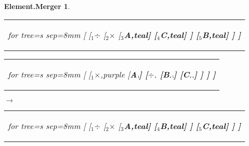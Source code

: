 \documentclass[UTF8,10pt]{ctexart}
\newcommand{\subtreeA}{\bf A}
\newcommand{\subtreeB}{\bf B}
\newcommand{\subtreeC}{\bf C}
\newcommand{\I}{$_{\scriptscriptstyle 1}$}
\newcommand{\II}{$_{\scriptscriptstyle 2}$}
\newcommand{\III}{$_{\scriptscriptstyle 3}$}
\newcommand{\IV}{$_{\scriptscriptstyle 4}$}
\newcommand{\V}{$_{\scriptscriptstyle 5}$}
\newcommand{\lc}{$_{\:\!\scriptscriptstyle\rm l\!}$}
\newcommand{\rc}{$_{\:\!\scriptscriptstyle\rm r\!}$}
\newcommand{\Multiplication}{$\times$}
\newcommand{\Division}{$\div$}
\newtheorem*{Element.Merger}{\bf Element.Merger }
\begin{document}
\begin{center}
\begin{Element.Merger}
\begin{tabular}{c}
				\begin{forest}
					for tree={s sep=8mm}
					[
						[\I\Division
							[\II\Multiplication
								[\III\subtreeA,teal]
								[\IV\subtreeC,teal]
							]
							[\V\subtreeB,teal]
						]
					]
				\end{forest}
			\end{tabular}
			\par\bigskip
			\begin{tabular}{c}
				\begin{forest}
					for tree={s sep=8mm}
					[
						[\I\Multiplication,purple
							[\subtreeA\lc]
							[\Division\rc
								[\subtreeB\rc\lc]
								[\subtreeC\rc\rc]
							]
						]
					]
				\end{forest}
			\end{tabular}
			\qquad
			$\longrightarrow$
			\qquad
			\begin{tabular}{c}
				\begin{forest}
					for tree={s sep=8mm}
					[
						[\I\Division
							[\II\Multiplication
								[\III\subtreeA,teal]
								[\IV\subtreeB,teal]
							]
							[\V\subtreeC,teal]
						]
					]
				\end{forest}
			\end{tabular}
		\end{Element.Merger}
	\vspace*{\fill}\end{center}

	\newpage
\end{document}
